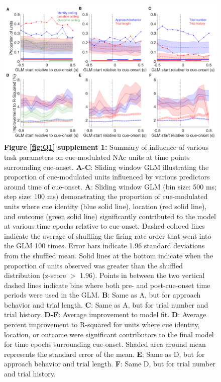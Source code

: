 \documentclass[11pt]{article}
\newcommand{\bsf}[1]{\textbf{#1}}
\begin{document}
 \begin{figure}[ht!]
\centering
\includegraphics[width=\textwidth]{Fig 4 - SUPP GLM.pdf}
\caption*{\bsf{Figure \ref{fig:Q1} supplement 1:} Summary of influence of various task parameters on cue-modulated NAc units at time points surrounding cue-onset. \bsf{A-C}: Sliding window GLM illustrating the proportion of cue-modulated units influenced by various predictors around time of cue-onset. \bsf{A}: Sliding window GLM (bin size: 500 ms; step size: 100 ms) demonstrating the proportion of cue-modulated units where cue identity (blue solid line), location (red solid line), and outcome (green solid line) significantly contributed to the model at various time epochs relative to cue-onset. Dashed colored lines indicate the average of shuffling the firing rate order that went into the GLM 100 times. Error bars indicate 1.96 standard deviations from the shuffled mean. Solid lines at the bottom indicate when the proportion of units observed was greater than the shuffled distribution (z-score $>$ 1.96). Points in between the two vertical dashed lines indicate bins where both pre- and post-cue-onset time periods were used in the GLM. \bsf{B}: Same as A, but for approach behavior and trial length. \bsf{C}: Same as A, but for trial number and trial history. \bsf{D-F}: Average improvement to model fit. \bsf{D}: Average percent improvement to R-squared for units where cue identity, location, or outcome were significant contributors to the final model for time epochs surrounding cue-onset. Shaded area around mean represents the standard error of the mean. \bsf{E}: Same as D, but for approach behavior and trial length. \bsf{F}: Same D, but for trial number and trial history.}
\label{fig:Q1SUPP1}
\end{figure} \clearpage
\end{document}
